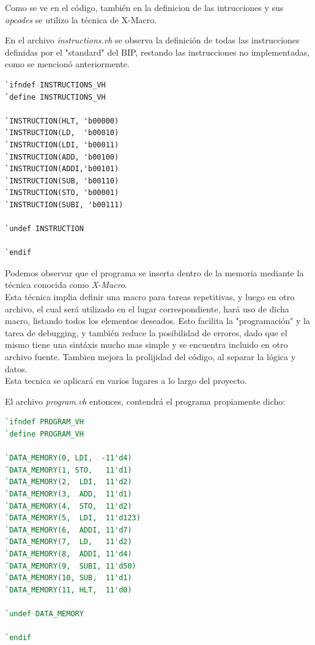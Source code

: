\documentclass{article}
\begin{document}
Como se ve en el código, también en la definicion de las intrucciones y sus
\textit{opcodes} se utilizo la técnica de X-Macro.

En el archivo \textit{instructions.vh} se observa la definición de todas las instrucciones
definidas por el "standard" del BIP, restando las instrucciones no implementadas, como
se mencionó anteriormente.

\begin{shaded}
\begin{lstlisting}
`ifndef INSTRUCTIONS_VH
`define INSTRUCTIONS_VH

`INSTRUCTION(HLT, 'b00000)
`INSTRUCTION(LD,  'b00010)
`INSTRUCTION(LDI, 'b00011)
`INSTRUCTION(ADD, 'b00100)
`INSTRUCTION(ADDI,'b00101)
`INSTRUCTION(SUB, 'b00110)
`INSTRUCTION(STO, 'b00001)
`INSTRUCTION(SUBI, 'b00111)

`undef INSTRUCTION

`endif
\end{lstlisting}
\end{shaded}

\newpage

Podemos observar que el programa se inserta dentro de la memoria mediante la técnica conocida como \textit{X-Macro}. \\
Esta técnica implia definir una macro para tareas repetitivas, y luego en otro archivo, el cual
será utilizado en el lugar correspondiente, hará uso de dicha macro, listando todos los elementos deseados.
Esto facilita la "programación" y la tarea de debugging, y también reduce la posibilidad de errores,
dado que el mismo tiene una sintáxis mucho mas simple y se encuentra incluido en otro archivo fuente.
Tambien mejora la prolijidad del código, al separar la lógica y datos. \\

Esta tecnica se aplicará en varios lugares a lo largo del proyecto.

El archivo \textit{program.vh} entonces, contendrá el programa propiamente dicho:

\begin{shaded}
\begin{lstlisting}[language=Verilog]
`ifndef PROGRAM_VH
`define PROGRAM_VH

`DATA_MEMORY(0, LDI,  -11'd4)
`DATA_MEMORY(1, STO,   11'd1)
`DATA_MEMORY(2,  LDI,  11'd2)
`DATA_MEMORY(3,  ADD,  11'd1)
`DATA_MEMORY(4,  STO,  11'd2)
`DATA_MEMORY(5,  LDI,  11'd123)
`DATA_MEMORY(6,  ADDI, 11'd7)
`DATA_MEMORY(7,  LD,   11'd2)
`DATA_MEMORY(8,  ADDI, 11'd4)
`DATA_MEMORY(9,  SUBI, 11'd50)
`DATA_MEMORY(10, SUB,  11'd1)
`DATA_MEMORY(11, HLT,  11'd0)

`undef DATA_MEMORY

`endif
\end{lstlisting}
\end{shaded}
\end{document}

